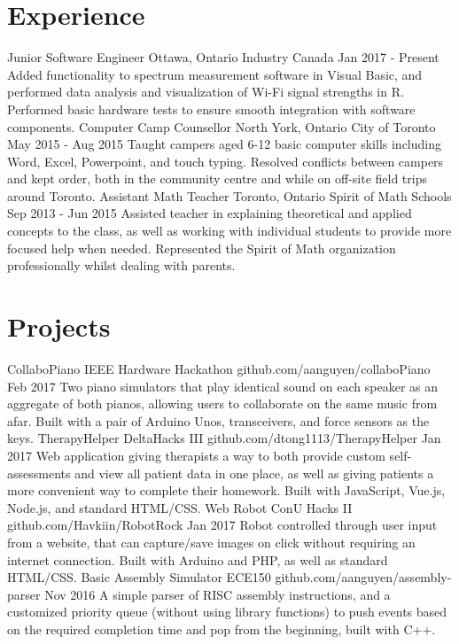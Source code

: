 \documentclass[]{aanguyen_cv}
\begin{document}
	\begin{main}%
		\vspace{35pt}%
		\section{Experience}
			\mainentry%
				{Junior Software Engineer}%
				{Ottawa, Ontario}%
				{Industry Canada}%
				{Jan 2017 - Present}%
				{Added functionality to spectrum measurement software in Visual Basic, and performed data analysis and visualization of Wi-Fi signal strengths in R. Performed basic hardware tests to ensure smooth integration with software components.}
			\mainentry%
				{Computer Camp Counsellor}%
				{North York, Ontario}%
				{City of Toronto}%
				{May 2015 - Aug 2015}%
				{Taught campers aged 6-12 basic computer skills including Word, Excel, Powerpoint, and touch typing. Resolved conflicts between campers and kept order, both in the community centre and while on off-site field trips around Toronto.}
			\mainentry%
				{Assistant Math Teacher}%
				{Toronto, Ontario}%
				{Spirit of Math Schools}%
				{Sep 2013 - Jun 2015}%
				{Assisted teacher in explaining theoretical and applied concepts to the class, as well as working with individual students to provide more focused help when needed. Represented the Spirit of Math organization professionally whilst dealing with parents.}
			\vspace{0.65cm}%
		\section{Projects}
			\mainentry%
				{CollaboPiano {\faGithub}}%
				{IEEE Hardware Hackathon}%
				{github.com/aanguyen/collaboPiano}%
				{Feb 2017}%
				{Two piano simulators that play identical sound on each speaker as an aggregate of both pianos, allowing users to collaborate on the same music from afar. Built with a pair of Arduino Unos, transceivers, and force sensors as the keys.}
			\mainentry%
				{TherapyHelper {\faGithub}}%
				{DeltaHacks III}%
				{github.com/dtong1113/TherapyHelper}%
				{Jan 2017}%
				{Web application giving therapists a way to both provide custom self-assessments and view all patient data in one place, as well as giving patients a more convenient way to complete their homework. Built with JavaScript, Vue.js, Node.js, and standard HTML/CSS.}
			\mainentry%
				{Web Robot {\faGithub}}%
				{ConU Hacks II}%
				{github.com/Havkiin/RobotRock}%
				{Jan 2017}%
				{Robot controlled through user input from a website, that can capture/save images on click without requiring an internet connection. Built with Arduino and PHP, as well as standard HTML/CSS.}
			\mainentry%
				{Basic Assembly Simulator {\faGithub}}%
				{ECE150}%
				{github.com/aanguyen/assembly-parser}%
				{Nov 2016}%
				{A simple parser of RISC assembly instructions, and a customized priority queue (without using library functions) to push events based on the required completion time and pop from the beginning, built with C++.}
			\vspace{0.65cm}%
	\end{main}%
\end{document}
